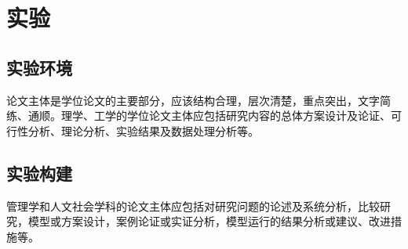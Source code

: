 
\section{实验}
\label{section:experiment}
\subsection{实验环境}
论文主体是学位论文的主要部分，应该结构合理，层次清楚，重点突出，文字简练、通顺。理学、工学的学位论文主体应包括研究内容的总体方案设计及论证、可行性分析、理论分析、实验结果及数据处理分析等。
\subsection{实验构建}
管理学和人文社会学科的论文主体应包括对研究问题的论述及系统分析，比较研究，模型或方案设计，案例论证或实证分析，模型运行的结果分析或建议、改进措施等。
